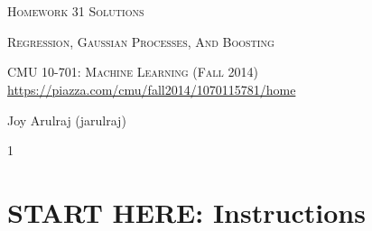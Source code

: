 \documentclass{article}
\def \issoln {1}
\begin{document}
\section*{}
\begin{center}
  \centerline{\textsc{\LARGE Homework 3{\if\issoln 1 Solutions \else \fi}}}
  \vspace{0.5em}
  \centerline{\textsc{\Large Regression, Gaussian Processes, And Boosting}}
  \vspace{1em}
  \textsc{\large CMU 10-701: Machine Learning (Fall 2014)} \\
  \url{https://piazza.com/cmu/fall2014/1070115781/home}
  \vspace{3em}
  \centerline{\large{Joy Arulraj (jarulraj)}}
  \vspace{1em}
\end{center}

\if\issoln 1 \else
\section*{START HERE: Instructions}
\end{document}
